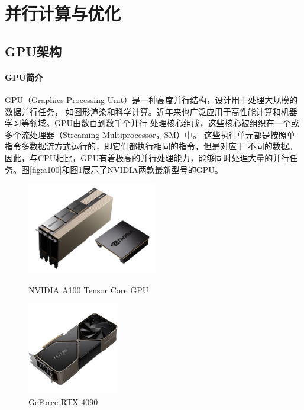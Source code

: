 \section{并行计算与优化}

\subsection{GPU架构}

\paragraph{GPU简介}

\par GPU（Graphics Processing Unit）是一种高度并行结构，设计用于处理大规模的数据并行任务，
如图形渲染和科学计算。近年来也广泛应用于高性能计算和机器学习等领域。GPU由数百到数千个并行
处理核心组成，这些核心被组织在一个或多个流处理器（Streaming Multiprocessor，SM）中。
这些执行单元都是按照单指令多数据流方式运行的，即它们都执行相同的指令，但是对应于
不同的数据。因此，与CPU相比，GPU有着极高的并行处理能力，能够同时处理大量的并行任务。图\ref{fig:a100}和图\ref{fig:4090}展示了NVIDIA两款最新型号的GPU。

\begin{figure}[htb]
    \centering
    \begin{minipage}[t]{0.45\textwidth}
    \centering
    \includegraphics[height=4cm,keepaspectratio]{figures/a100.png}
    \caption{NVIDIA A100 Tensor Core GPU}
    \label{fig:a100}
    \end{minipage}
    \begin{minipage}[t]{0.45\textwidth}
    \centering
    \includegraphics[height=4cm,keepaspectratio]{figures/4090.jpg}
    \caption{GeForce RTX 4090}
    \label{fig:4090}
    \end{minipage}
\end{figure}

